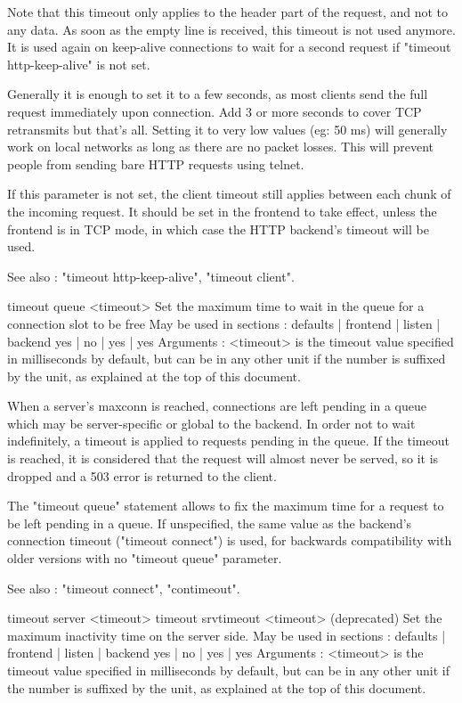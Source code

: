   Note that this timeout only applies to the header part of the request, and
  not to any data. As soon as the empty line is received, this timeout is not
  used anymore. It is used again on keep-alive connections to wait for a second
  request if "timeout http-keep-alive" is not set.

  Generally it is enough to set it to a few seconds, as most clients send the
  full request immediately upon connection. Add 3 or more seconds to cover TCP
  retransmits but that's all. Setting it to very low values (eg: 50 ms) will
  generally work on local networks as long as there are no packet losses. This
  will prevent people from sending bare HTTP requests using telnet.

  If this parameter is not set, the client timeout still applies between each
  chunk of the incoming request. It should be set in the frontend to take
  effect, unless the frontend is in TCP mode, in which case the HTTP backend's
  timeout will be used.

  See also : "timeout http-keep-alive", "timeout client".


timeout queue <timeout>
  Set the maximum time to wait in the queue for a connection slot to be free
  May be used in sections :   defaults | frontend | listen | backend
                                 yes   |    no    |   yes  |   yes
  Arguments :
    <timeout> is the timeout value specified in milliseconds by default, but
              can be in any other unit if the number is suffixed by the unit,
              as explained at the top of this document.

  When a server's maxconn is reached, connections are left pending in a queue
  which may be server-specific or global to the backend. In order not to wait
  indefinitely, a timeout is applied to requests pending in the queue. If the
  timeout is reached, it is considered that the request will almost never be
  served, so it is dropped and a 503 error is returned to the client.

  The "timeout queue" statement allows to fix the maximum time for a request to
  be left pending in a queue. If unspecified, the same value as the backend's
  connection timeout ("timeout connect") is used, for backwards compatibility
  with older versions with no "timeout queue" parameter.

  See also : "timeout connect", "contimeout".


timeout server <timeout>
timeout srvtimeout <timeout> (deprecated)
  Set the maximum inactivity time on the server side.
  May be used in sections :   defaults | frontend | listen | backend
                                 yes   |    no    |   yes  |   yes
  Arguments :
    <timeout> is the timeout value specified in milliseconds by default, but
              can be in any other unit if the number is suffixed by the unit,
              as explained at the top of this document.

